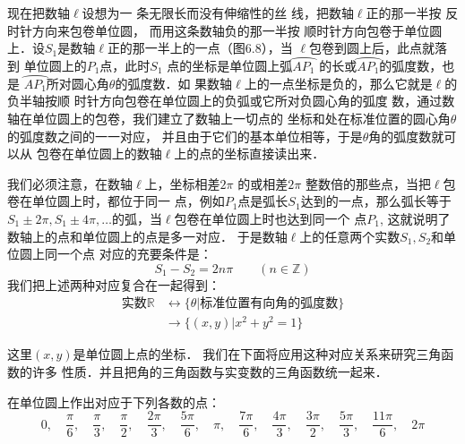 现在把数轴$\ell$设想为一
条无限长而没有伸缩性的丝
线，把数轴$\ell$正的那一半按
反时针方向来包卷单位圆，
而用这条数轴负的那一半按
顺时针方向包卷于单位圆上．设$S_1$是数轴$\ell$正的那一半上的一点（图6.8），当
$\ell$包卷到圆上后，此点就落到
单位圆上的$P_1$点，此时$S_1$
点的坐标是单位圆上弧$\wideparen{AP_1}$
的长或$\wideparen{AP_1}$的弧度数，也是
$\wideparen{AP_1}$所对圆心角$\theta$的弧度数．如
果数轴$\ell$上的一点坐标是负的，那么它就是$\ell$的负半轴按顺
时针方向包卷在单位圆上的负弧或它所对负圆心角的弧度
数，通过数轴在单位圆上的包卷，我们建立了数轴上一切点的
坐标和处在标准位置的圆心角$\theta$的弧度数之间的一一对应，
并且由于它们的基本单位相等，于是$\theta$角的弧度数就可以从
包卷在单位圆上的数轴$\ell$上的点的坐标直接读出来．

我们必须注意，在数轴$\ell$上，坐标相差$2\pi$ 的或相差$2\pi$ 
整数倍的那些点，当把$\ell$包卷在单位圆上时，都位于同一
点，例如$P_1$点是弧长$S_1$达到的一点，那么弧长等于$S_1\pm 2\pi,
S_1\pm 4\pi ,\ldots$的弧，当$\ell$包卷在单位圆上时也达到同一个
点$P_1$, 这就说明了数轴上的点和单位圆上的点是多一对应．
于是数轴$\ell$上的任意两个实数$S_1,S_2$和单位圆上同一个点
对应的充要条件是：
\[S_1-S_2=2n\pi \qquad  (n\in\mathbb{Z})\]
我们把上述两种对应复合在一起得到：
\begin{align*}
    \text{实数}\mathbb{R}& \longleftrightarrow  \{\theta|\text{标准位置有向角的弧度数}\}  \tag{一一对应}\\
& \longrightarrow \{(x,y)|x^2+y^2=1\} \tag{多一对应}
\end{align*}

这里$(x,y)$是单位圆上点的坐标．
我们在下面将应用这种对应关系来研究三角函数的许多
性质．并且把角的三角函数与实变数的三角函数统一起来．


\begin{example}
    在单位圆上作出对应于下列各数的点：
\[0,\quad \frac{\pi}{6},\quad \frac{\pi}{3},\quad \frac{\pi}{2},\quad \frac{2\pi}{3},\quad \frac{5\pi}{6},\quad \pi,\quad \frac{7\pi}{6},\quad \frac{4\pi}{3},\quad \frac{3\pi}{2},\quad \frac{5\pi}{3},\quad \frac{11\pi}{6},\quad 2\pi\]
\end{example}

